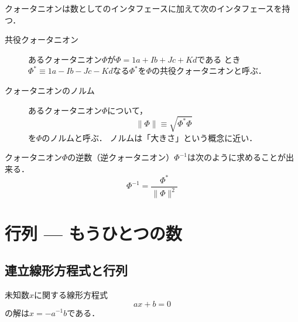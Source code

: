 \documentclass{jsbook}
\newcommand{\ii}{I}%
\newcommand{\jj}{J}%
\newcommand{\kk}{K}%
\newcommand{\norm}[1]{\|{#1}\|}
\begin{document}
クォータニオンは数としてのインタフェースに加えて次のインタフェースを持つ．
\begin{description}
\item[共役クォータニオン] あるクォータニオン$\varPhi$が$\varPhi=1 a+\ii b+\jj c+\kk d$である
とき$\varPhi^*\equiv1 a-\ii b-\jj c-\kk d$なる$\varPhi^*$を$\varPhi$の共役クォータニオンと呼ぶ．
\item[クォータニオンのノルム] あるクォータニオン$\varPhi$について，
\begin{equation}\norm{\varPhi}\equiv\sqrt{\varPhi^*\varPhi}
\end{equation}
を$\varPhi$のノルムと呼ぶ．
ノルムは「大きさ」という概念に近い．
\end{description}

クォータニオン$\varPhi$の逆数（逆クォータニオン）$\varPhi^{-1}$は次のように求めることが出来る．
\begin{equation}
\varPhi^{-1}=\frac{\varPhi^*}{\norm{\varPhi}^2}
\end{equation}

\section{行列 --- もうひとつの数}

\subsection{連立線形方程式と行列}

未知数$x$に関する線形方程式
\begin{equation}
ax+b=0
\end{equation}
の解は$x=-a^{-1}b$である．
\end{document}
